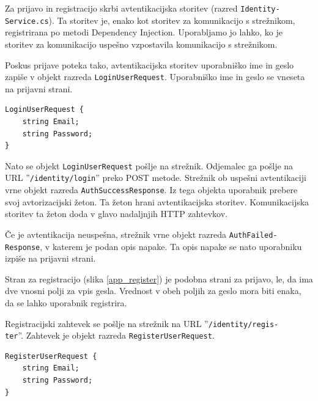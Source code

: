 \documentclass[a4paper, 12pt]{book}
\begin{document}
Za prijavo in registracijo skrbi avtentikacijska storitev (razred \texttt{Identity-\\Service.cs}).
Ta storitev je, enako kot storitev za komunikacijo s strežnikom, registrirana po metodi Dependency Injection.
Uporabljamo jo lahko, ko je storitev za komunikacijo uspešno vzpostavila komunikacijo s strežnikom.

Poskus prijave poteka tako, avtentikacijska storitev uporabniško ime in geslo zapiše v objekt razreda \texttt{LoginUserRequest}.
Uporabniško ime in geslo se vneseta na prijavni strani.

\begin{Verbatim}[commandchars=+\[\]]
LoginUserRequest {
    string Email; 
    string Password;
}
\end{Verbatim}

Nato se objekt \texttt{LoginUserRequest} pošlje na strežnik.
Odjemalec ga pošlje na URL ''\texttt{/identity/login}'' preko POST metode.
Strežnik ob uspešni avtentikaciji vrne objekt razreda \texttt{AuthSuccessResponse}.
Iz tega objekta uporabnik prebere svoj avtorizacijski žeton.
Ta žeton hrani avtentikacijska storitev.
Komunikacijska storitev ta žeton doda v glavo nadaljnjih HTTP zahtevkov.

Če je avtentikacija neuspešna, strežnik vrne objekt razreda \texttt{AuthFailed-\\Response}, v katerem je podan opis napake.
Ta opis napake se nato uporabniku izpiše na prijavni strani.

Stran za registracijo (slika \ref{app_register}) je podobna strani za prijavo, le, da ima dve vnosni polji za vpis gesla.
Vrednost v obeh poljih za geslo mora biti enaka, da se lahko uporabnik registrira.

Registracijski zahtevek se pošlje na strežnik na URL ''\texttt{/identity/regis-\\ter}''.
Zahtevek je objekt razreda \texttt{RegisterUserRequest}.

\begin{Verbatim}[commandchars=+\[\]]
RegisterUserRequest {
    string Email; 
    string Password;
}
\end{Verbatim}
\end{document}
